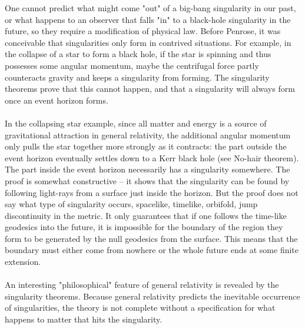  One cannot predict what might come "out" of a big-bang singularity in our past, or what happens to an observer that falls "in" to a black-hole singularity in the future, so they require a modification of physical law. Before Penrose, it was conceivable that singularities only form in contrived situations. For example, in the collapse of a star to form a black hole, if the star is spinning and thus possesses some angular momentum, maybe the centrifugal force partly counteracts gravity and keeps a singularity from forming. The singularity theorems prove that this cannot happen, and that a singularity will always form once an event horizon forms.
 \\
 \\
 In the collapsing star example, since all matter and energy is a source of gravitational attraction in general relativity, the additional angular momentum only pulls the star together more strongly as it contracts: the part outside the event horizon eventually settles down to a Kerr black hole (see No-hair theorem). The part inside the event horizon necessarily has a singularity somewhere. The proof is somewhat constructive – it shows that the singularity can be found by following light-rays from a surface just inside the horizon. But the proof does not say what type of singularity occurs, spacelike, timelike, orbifold, jump discontinuity in the metric. It only guarantees that if one follows the time-like geodesics into the future, it is impossible for the boundary of the region they form to be generated by the null geodesics from the surface. This means that the boundary must either come from nowhere or the whole future ends at some finite extension.\\
 \\
 
 An interesting "philosophical" feature of general relativity is revealed by the singularity theorems. Because general relativity predicts the inevitable occurrence of singularities, the theory is not complete without a specification for what happens to matter that hits the singularity. 
 
 
 
 
 
 
 
 
 
 
 
 
 
 
 
 
 
 
 
 
 
 
 
 
 
 
 
 
 
 
 
 
 
 
 
 
 
 
 
 
 
 
 
 
 
 
 

